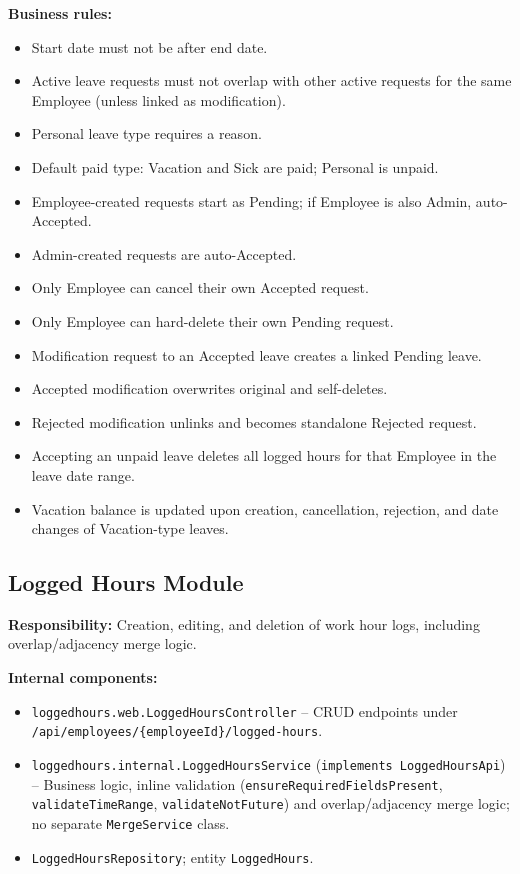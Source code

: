 \documentclass[11pt,a4paper]{article}
\begin{document}
\textbf{Business rules:}
\begin{itemize}[leftmargin=1.5em]
    \item Start date must not be after end date.
    \item Active leave requests must not overlap with other active requests for the same Employee (unless linked as modification).
    \item Personal leave type requires a reason.
    \item Default paid type: Vacation and Sick are paid; Personal is unpaid.
    \item Employee-created requests start as Pending; if Employee is also Admin, auto-Accepted.
    \item Admin-created requests are auto-Accepted.
    \item Only Employee can cancel their own Accepted request.
    \item Only Employee can hard-delete their own Pending request.
    \item Modification request to an Accepted leave creates a linked Pending leave.
    \item Accepted modification overwrites original and self-deletes.
    \item Rejected modification unlinks and becomes standalone Rejected request.
    \item Accepting an unpaid leave deletes all logged hours for that Employee in the leave date range.
    \item Vacation balance is updated upon creation, cancellation, rejection, and date changes of Vacation-type leaves.
\end{itemize}

\subsection{Logged Hours Module}

\textbf{Responsibility:} Creation, editing, and deletion of work hour logs, including overlap/adjacency merge logic.

\textbf{Internal components:}
\begin{itemize}[leftmargin=1.5em]
    \item \texttt{loggedhours.web.LoggedHoursController} -- CRUD endpoints under \texttt{/api/\allowbreak employees/\allowbreak\{employeeId\}/\allowbreak logged-hours}.
    \item \texttt{loggedhours.internal.LoggedHoursService} (\texttt{implements LoggedHoursApi}) -- Business logic, inline validation (\texttt{ensureRequiredFieldsPresent}, \texttt{validateTimeRange}, \texttt{validateNotFuture}) and overlap/adjacency merge logic; no separate \texttt{MergeService} class.
    \item \texttt{LoggedHoursRepository}; entity \texttt{LoggedHours}.
\end{itemize}
\end{document}
